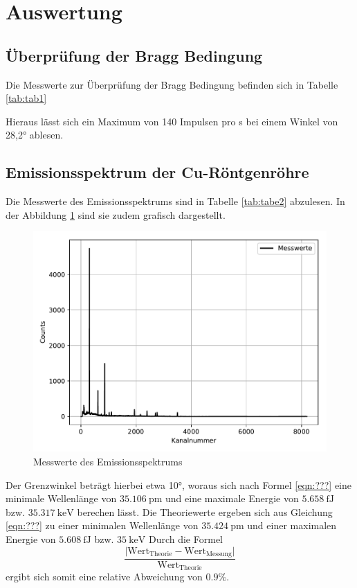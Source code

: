 \section{Auswertung}
\subsection{Überprüfung der Bragg Bedingung}
Die Messwerte zur Überprüfung der Bragg Bedingung befinden sich in Tabelle \ref{tab:tab1}


Hieraus lässt sich ein Maximum von 140 Impulsen pro s bei einem Winkel von 28,2°
ablesen.

\subsection{Emissionsspektrum der Cu-Röntgenröhre}
Die Messwerte des Emissionsspektrums sind in Tabelle \ref{tab:tabe2} abzulesen. In
der Abbildung \ref{fig:plot1} sind sie zudem grafisch dargestellt.
\begin{figure}[H]
  \centering
  \includegraphics{plot1.pdf}
  \caption{Messwerte des Emissionsspektrums}
  \label{fig:plot1}
\end{figure}
Der Grenzwinkel beträgt hierbei etwa 10°, woraus sich nach Formel \ref{eqn:???} eine minimale
Wellenlänge von $ \SI{35.106}{\pico\meter}$ und eine maximale Energie von $\SI{5.658}{\femto\joule}$
bzw. $\SI{35.317}{\kilo \electronvolt}$ berechen lässt. Die Theoriewerte ergeben sich
aus Gleichung \ref{eqn:???} zu einer minimalen Wellenlänge von $ \SI{35.424}{\pico\meter}$
und einer maximalen Energie von $\SI{5.608}{\femto\joule}$
bzw. $\SI{35}{\kilo \electronvolt}$
Durch die Formel
\begin{equation*}
  \frac{\lvert \text{Wert}_{\text{Theorie}}-\text{Wert}_{\text{Messung}}\rvert}{\text{Wert}_{\text{Theorie}}}
  \label{eqn:abw}
\end{equation*}
ergibt sich somit eine relative Abweichung von $0.9 \%$.

